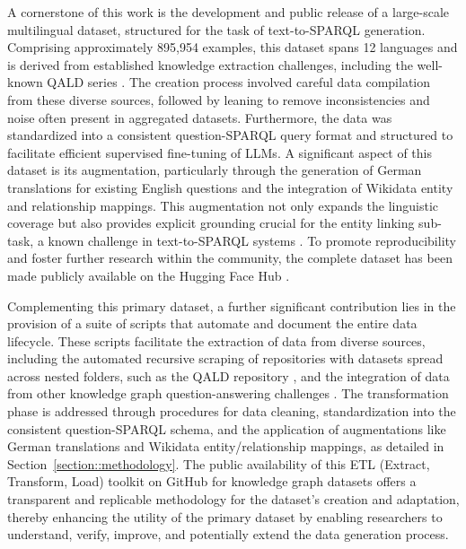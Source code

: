 A cornerstone of this work is the development and public release of a large-scale multilingual dataset, structured for the task of text-to-SPARQL generation.
Comprising approximately 895,954 examples, this dataset spans 12 languages and is derived from established knowledge extraction challenges, including the well-known QALD series \cite{usbeck2024qald}. 
The creation process involved careful data compilation from these diverse sources, followed by leaning to remove inconsistencies and noise often present in aggregated datasets.
Furthermore, the data was standardized into a consistent question-SPARQL query format and structured to facilitate efficient supervised fine-tuning of LLMs.
A significant aspect of this dataset is its augmentation, particularly through the generation of German translations for existing English questions and the integration of Wikidata entity and relationship mappings.
This augmentation not only expands the linguistic coverage but also provides explicit grounding crucial for the entity linking sub-task, a known challenge in text-to-SPARQL systems \cite{brei2024leveraging}.
To promote reproducibility and foster further research within the community, the complete dataset has been made publicly available on the Hugging Face Hub \cite{lhoest2021datasets}.

Complementing this primary dataset, a further significant contribution lies in the provision of a suite of scripts that automate and document the entire data lifecycle.
These scripts facilitate the extraction of data from diverse sources, including the automated recursive scraping of repositories with datasets spread across nested folders, such as the QALD repository \cite{QALD_repository}, and the integration of data from other knowledge graph question-answering challenges \cite{jiang2022knowledge}.
The transformation phase is addressed through procedures for data cleaning, standardization into the consistent question-SPARQL schema, and the application of augmentations like German translations and Wikidata entity/relationship mappings, as detailed in Section~\ref{section::methodology}.
The public availability of this ETL (Extract, Transform, Load) toolkit on GitHub for knowledge graph datasets offers a transparent and replicable methodology for the dataset's creation and adaptation, thereby enhancing the utility of the primary dataset by enabling researchers to understand, verify, improve, and potentially extend the data generation process.

